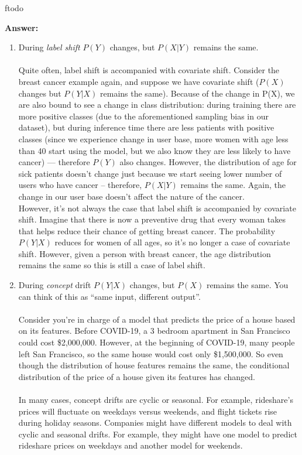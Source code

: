 ƒtodo\documentclass{article}
\newenvironment{QandA}{\begin{enumerate}[label=\arabic*.]}{\end{enumerate}}
\newenvironment{InnerQandA}{\begin{enumerate}[label=\roman*.]}{\end{enumerate}}
\newenvironment{ListAlph}{\begin{enumerate}[label=(\alph*)]}{\end{enumerate}}
\newenvironment{answer}{\par\normalfont \textbf{Answer:}}{}
\newcommand{\g}{\vert}
\begin{document}
\begin{QandA}
\begin{InnerQandA}
\begin{answer}
\begin{ListAlph}
            \item During \textit{label shift} $P(Y)$ changes, but $P(X \g Y)$ remains the same.  \\\\
            Quite often, label shift is accompanied with covariate shift. Consider the breast cancer example again, and suppose we have covariate shift ($P(X)$ changes but $P(Y \g X)$ remains the same). Because of the change in P(X), we are also bound to see a change in class distribution: during training there are more positive classes (due to the aforementioned sampling bias in our dataset), but during inference time there are less patients with positive classes (since we experience change in user base, more women with age less than 40 start using the model, but we also know they are less likely to have cancer) — therefore $P(Y)$ also changes. However, the distribution of age for sick patients doesn't change just because we start seeing  lower number of users who have cancer -- therefore, $P(X \g Y)$ remains the same. Again, the change in our user base doesn't affect the nature of the cancer. \\
            
            However, it’s not always the case that label shift is accompanied by covariate shift. Imagine that there is now a preventive drug that every woman takes that helps reduce their chance of getting breast cancer. The probability $P(Y \g X)$ reduces for women of all ages, so it’s no longer a case of covariate shift. However, given a person with breast cancer, the age distribution remains the same so this is still a case of label shift.\\
            
            \item During \textit{concept} drift $P(Y \g X)$ changes, but $P(X)$ remains the same. You can think of this as “same input, different output”. \\\\
            Consider you’re in charge of a model that predicts the price of a house based on its features. Before COVID-19, a 3 bedroom apartment in San Francisco could cost \$2,000,000. However, at the beginning of COVID-19, many people left San Francisco, so the same house would cost only \$1,500,000. So even though the distribution of house features remains the same, the conditional distribution of the price of a house given its features has changed.\\\\
            In many cases, concept drifts are cyclic or seasonal. For example, rideshare’s prices will fluctuate on weekdays versus weekends, and flight tickets rise during holiday seasons. Companies might have different models to deal with cyclic and seasonal drifts. For example, they might have one model to predict rideshare prices on weekdays and another model for weekends.
            

\end{ListAlph}
\end{answer}
\end{InnerQandA}
\end{QandA}
\end{document}
